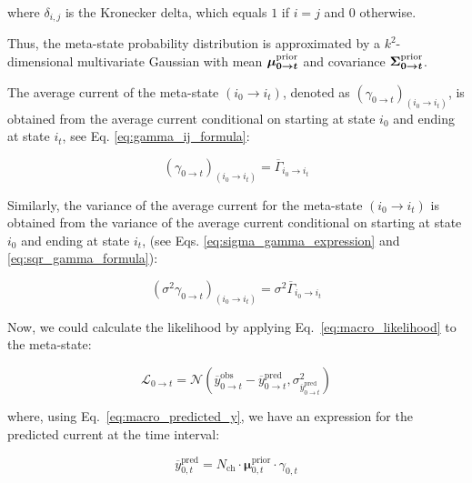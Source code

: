 \documentclass[pdflatex,sn-mathphys-num]{sn-jnl}%
\theoremstyle{thmstyleone}%
\theoremstyle{thmstyletwo}%
\theoremstyle{thmstylethree}%
\begin{document}
where \( \delta_{i, j} \) is the Kronecker delta, which equals \( 1 \) if \( i = j \) and \( 0 \) otherwise.

Thus, the meta-state probability distribution is approximated by a \( k^2 \)-dimensional multivariate Gaussian with mean \( \boldmath{\mu}^{\text{prior}}_{0 \rightarrow t} \) and covariance \( \boldmath{\Sigma}^{\text{prior}}_{0 \rightarrow t} \).

The average current of the meta-state \( (i_0 \rightarrow i_t) \), denoted as \( ({\gamma}_{0 \rightarrow t})_{(i_0 \rightarrow i_t)} \), is obtained from the average current conditional on starting at state \( i_0 \) and ending at state \( i_t \), see Eq. \ref{eq:gamma_ij_formula}:

\begin{equation}
	({\gamma}_{0 \rightarrow t})_{(i_0 \rightarrow i_t)} = \overline{\Gamma}_{i_0 \rightarrow i_t}
	\label{eq:meta_gamma_prior}
\end{equation}

Similarly, the variance of the average current for the meta-state \( (i_0 \rightarrow i_t) \) is obtained from the variance of the average current conditional on starting at state $i_0$ and ending at state $i_t$, (see Eqs. \ref{eq:sigma_gamma_expression} and \ref{eq:sqr_gamma_formula}):

\begin{equation}
	(\sigma^2{\gamma}_{0 \rightarrow t})_{(i_0 \rightarrow i_t)} = \sigma^2 \overline{\Gamma}_{i_0 \rightarrow i_t}
	\label{eq:meta_sigma_gamma_prior}
\end{equation}

Now, we could calculate the likelihood by applying Eq.~\ref{eq:macro_likelihood} to the meta-state:

\begin{equation}
	\mathcal{L}_{0 \rightarrow t} = \mathcal{N}(\overline{y}^{\text{obs}}_{0 \rightarrow t} - \overline{y}^{\text{pred}}_{0 \rightarrow t}, \sigma^2_{\overline{y}^{\text{pred}}_{0 \rightarrow t}})
	\label{eq:meta_macro_likelihood}
\end{equation}

where, using Eq.~\ref{eq:macro_predicted_y}, we have an expression for the predicted current at the time interval:

\begin{equation}
	\overline{y}^{\text{pred}}_{0,t} = N_{\text{ch}} \cdot \mathbf{\mu}^{\text{prior}}_{0,t} \cdot \gamma_{0,t}
	\label{eq:meta_macro_predicted_y}
\end{equation}
\end{document}
